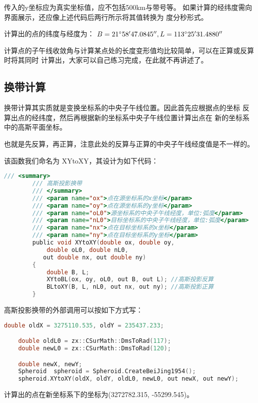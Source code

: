 传入的y坐标应为真实坐标值，应不包括500km与带号等。
如果计算的经纬度需向界面展示，还应像上述代码后两行所示将其值转换为
度分秒形式。

计算出的点的纬度与经度为：
$B=21 ^\circ 58'47.0845'', L=113^\circ 25'31.4880''$

计算点的子午线收敛角与计算某点处的长度变形值均比较简单，可以在正算或反算时将其同时
计算出，大家可以自己练习完成，在此就不再讲述了。

\subsection{换带计算}
换带计算其实质就是变换坐标系的中央子午线位置。因此首先应根据点的坐标
反算出点的经纬度，然后再根据新的坐标系中央子午线位置计算出点在
新的坐标系中的高斯平面坐标。

也就是先反算，再正算，注意此处的反算与正算的中央子午线经度值是不一样的。

该函数我们命名为 XYtoXY，其设计为如下代码：

\begin{lstlisting}[language=C]
        /// <summary>
        /// 高斯投影换带
        /// </summary>
        /// <param name="ox">点在源坐标系的x坐标</param>
        /// <param name="oy">点在源坐标系的y坐标</param>
        /// <param name="oL0">源坐标系的中央子午线经度，单位:弧度</param>
        /// <param name="nL0">目标坐标系的中央子午线经度，单位:弧度</param>
        /// <param name="nx">点在目标坐标系的x坐标</param>
        /// <param name="ny">点在目标坐标系的y坐标</param>
        public void XYtoXY(double ox, double oy,
            double oL0, double nL0,
           out double nx, out double ny)
        {
            double B, L;
            XYtoBL(ox, oy, oL0, out B, out L); //高斯投影反算
            BLtoXY(B, L, nL0, out nx, out ny); //高斯投影正算
        }
\end{lstlisting}

高斯投影换带的外部调用可以按如下方式写：

\begin{lstlisting}[language=C]
    double oldX = 3275110.535, oldY = 235437.233;

    double oldL0 = zx::CSurMath::DmsToRad(117);
    double newL0 = zx::CSurMath::DmsToRad(120);

    double newX, newY;
    Spheroid  spheroid = Spheroid.CreateBeiJing1954();
    spheroid.XYtoXY(oldX, oldY, oldL0, newL0, out newX, out newY);
\end{lstlisting}

计算出的点在新坐标系下的坐标为(3272782.315, -55299.545)。

